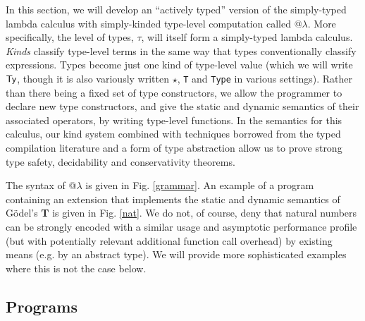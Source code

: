 \documentclass[9pt,preprint]{sigplanconf}
\begin{document}
In this section, we will develop an ``actively typed'' version of the simply-typed lambda calculus with simply-kinded type-level computation called @$\lambda$. More specifically, the level of types, $\tau$, will itself form a simply-typed lambda calculus. \emph{Kinds} classify type-level terms in the same way that types conventionally classify expressions. Types become just one kind  of type-level value (which we will write $\textsf{Ty}$, though it is also variously written $\star$, \verb|T| and \verb|Type| in various settings). Rather than there being a fixed set of type constructors, we allow the programmer to declare new type  constructors, and give the static and dynamic semantics of their associated operators, by writing type-level functions. In the semantics for this calculus, our kind system combined with techniques borrowed from the typed compilation literature and a form of type abstraction allow us to prove strong type safety, decidability and conservativity theorems.

The syntax of @$\lambda$ is given in Fig. \ref{grammar}. An example of a program containing an extension that implements the static and dynamic semantics of G\"odel's \textbf{T} is given in Fig. \ref{nat}. We do not, of course, deny that natural numbers can be strongly encoded with a similar usage and asymptotic performance profile (but with potentially relevant additional function call overhead) by existing means (e.g. by an abstract type). We will provide more sophisticated examples where this is not the case below. %

\subsection{Programs}
\end{document}
